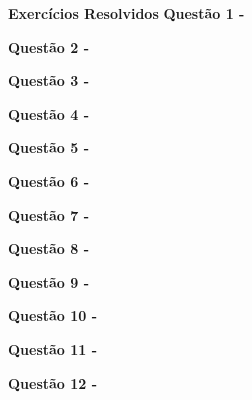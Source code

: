 \textbf{Exercícios Resolvidos}   
    \vspace{0.5cm}\textbf{Questão 1 -}
    
    
        
    \vspace{0.5cm}\textbf{Questão 2 -}
    
    
    
    \vspace{0.5cm}\textbf{Questão 3 -}
    
    
    
    \vspace{0.5cm}\textbf{Questão 4 -}
    
    
    
    \vspace{0.5cm}\textbf{Questão 5 -}
    
    
    
    \vspace{0.5cm}\textbf{Questão 6 -}
    
    
    
    \vspace{0.5cm}\textbf{Questão 7 -}
    
    
    
    \vspace{0.5cm}\textbf{Questão 8 -}
    
    
    
    \vspace{0.5cm}\textbf{Questão 9 -}
    
    
    
    \vspace{0.5cm}\textbf{Questão 10 -}
    
    
    
    \vspace{0.5cm}\textbf{Questão 11 -}
    
    
    
    \vspace{0.5cm}\textbf{Questão 12 -}
    
